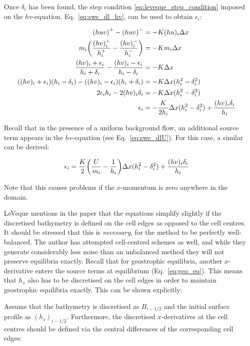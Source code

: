 Once $\delta_i$ has been found, the step condition \ref{eq:leveque_step_condition} imposed on the $hv$-equation, Eq.~\ref{eq:swe_dl_hv}, can be used to obtain $\epsilon_i$:

\begin{align}
  \qty(huv)^+ - \qty(huv)^- &= -K(hu)_i\Delta x \\
  m_i\qty(\frac{(hv)_i^+}{h_i^+} - \frac{(hv)_i^-}{h_i^-}) &= -K m_i \Delta x \\
  \frac{(hv)_i + \epsilon_i}{h_i + \delta_i} - \frac{(hv)_i - \epsilon_i}{h_i - \delta_i} &= -K \Delta x \\
  ((hv)_i+\epsilon_i)(h_i-\delta_i) - ((hv)_i-\epsilon_i)(h_i+\delta_i) &= -K\Delta x (h_i^2 - \delta_i^2) \\
  2\epsilon_i h_i - 2(hv)_i \delta_i &= -K\Delta x (h_i^2 - \delta_i^2) \\
  \epsilon_i &= -\frac{K}{2h_i} \Delta x(h_i^2 - \delta_i^2) + \frac{(hv)_i \delta_i}{h_i}
\end{align}

Recall that in the presence of a uniform background flow, an additional source term appears in the $hv$-equation (see Eq.~\ref{eq:swe_dlU}). For this case, a similar can be derived:

\begin{equation}
  \epsilon_i = \frac{K}{2} \qty(\frac{U}{m_i} - \frac{1}{h_i}) \Delta x(h_i^2 - \delta_i^2) + \frac{(hv)_i \delta_i}{h_i}
\end{equation}

Note that this causes problems if the $x$-momentum is zero anywhere in the domain.

LeVeque mentions in the paper that the equations simplify slightly if the discretised bathymetry is defined on the cell edges as opposed to the cell centres. It should be stressed that this is \emph{necessary}, for the method to be perfectly well-balanced. The author has attempted cell-centred schemes as well, and while they generate considerably less noise than an unbalanced method they will not preserve equilibria exactly. Recall that for geostrophic equilibria, another $x$-derivative enters the source terms at equilibrium (Eq.~\ref{eq:geo_eq}). This means that $h_s$ also has to be discretised on the cell edges in order to maintain geostrophic equilibria exactly. This can be shown explicitly:

Assume that the bathymetry is discretised as $B_{i-1/2}$ and the initial surface profile as $(h_s)_{i-1/2}$. Furthermore, the discretised $x$-derivatives at the cell centres should be defined via the central differences of the corresponding cell edges:


